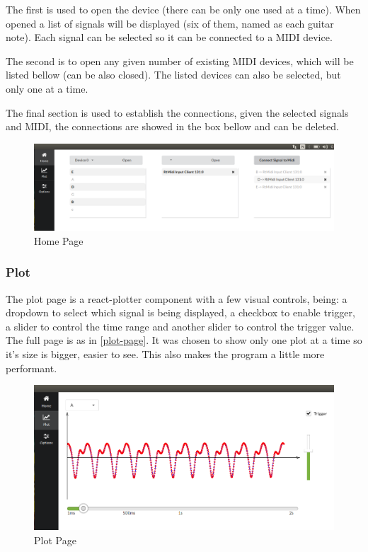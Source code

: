 The first is used to open the device (there can be only one used at a time). When opened
a list of signals will be displayed (six of them, named as each guitar note).
Each signal can be selected so it can be connected to a MIDI device.

The second is to open any given number of existing MIDI devices, which will be listed
bellow (can be also closed). The listed devices can also be selected, but only one at a time. 

The final section is used to establish the connections, given the selected signals
and MIDI, the connections are showed in the box bellow and can be deleted.
\begin{figure}[htb]
	\caption{Home Page}
  \label{home-page}
	\begin{center}
    \includegraphics[width=0.7\paperwidth]{images/snapshots/home}
	\end{center}
\end{figure}

\subsubsection{Plot}
The plot page is a react-plotter \cite{react-plotter} component with a few
visual controls, being: a dropdown to select which signal is being displayed,
a checkbox to enable trigger, a slider to control the time
range and another slider to control the trigger value. The full page is as in \autoref{plot-page}.
It was chosen to show only one plot at a time so it's size is bigger, easier to see.
This also makes the program a little more performant.
\begin{figure}[htb]
	\caption{Plot Page}
  \label{plot-page}
	\begin{center}
    \includegraphics[width=0.7\paperwidth]{images/snapshots/plot-trigger-A}
	\end{center}
\end{figure}

